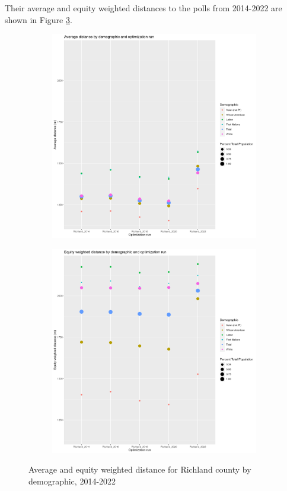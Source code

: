 \documentclass[11pt]{article}
\theoremstyle{remark}
\theoremstyle{definition}
\begin{document}
Their average and equity weighted distances to the polls from 2014-2022 are shown in Figure \ref{fig:Richland distance graphs}.

\begin{figure}
	\begin{subfigure}{.8\textwidth}
		\centering
		\includegraphics[width=.8\linewidth]{result_analysis/Richland_SC_original_configs/orig_pop_scaled_avg}
		\label{sfig:Richland avg dist}
	\end{subfigure} \newline
	\begin{subfigure}{.8\textwidth}
		\centering
		\includegraphics[width=.8\linewidth]{result_analysis/Richland_SC_original_configs/orig_pop_scaled_y_EDE}
		\label{sfig:Richland equity dist}
	\end{subfigure}
	\caption{Average and equity weighted distance for Richland county by demographic, 2014-2022}
	\label{fig:Richland distance graphs}
\end{figure}
\end{document}

